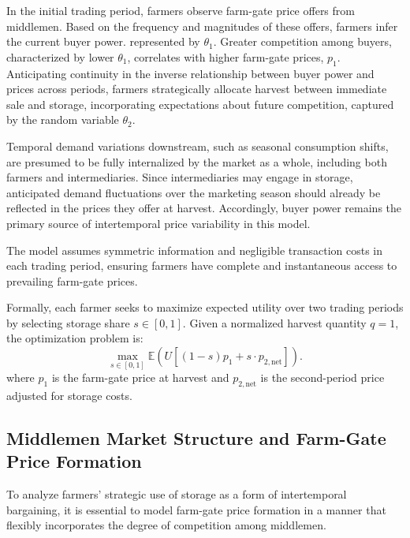 In the initial trading period, farmers observe farm-gate price offers from middlemen. Based on the frequency and magnitudes of these offers, farmers infer the current buyer power. represented by $\theta_1$. Greater competition among buyers, characterized by lower $\theta_1$, correlates with higher farm-gate prices, $p_1$. Anticipating continuity in the inverse relationship between buyer power and prices across periods, farmers strategically allocate harvest between immediate sale and storage, incorporating expectations about future competition, captured by the random variable $\theta_2$.

Temporal demand variations downstream, such as seasonal consumption shifts, are presumed to be fully internalized by the market as a whole, including both farmers and intermediaries. Since intermediaries may engage in storage, anticipated demand fluctuations over the marketing season should already be reflected in the prices they offer at harvest. Accordingly, buyer power remains the primary source of intertemporal price variability in this model.

The model assumes symmetric information and negligible transaction costs in each trading period, ensuring farmers have complete and instantaneous access to prevailing farm-gate prices.

Formally, each farmer seeks to maximize expected utility over two trading periods by selecting storage share $s \in [0,1]$. Given a normalized harvest quantity $q = 1$, the optimization problem is:
\begin{equation}
\label{eq:starting objective}
\max_{s \in [0,1]} \mathbb{E} \left(U\left[ (1 - s) p_1 + s \cdot p_{2,\text{net}} \right]\right).
\end{equation}
where $p_1$ is the farm-gate price at harvest and $p_{2,\text{net}}$ is the second-period price adjusted for storage costs.



\subsection{Middlemen Market Structure and Farm-Gate Price Formation} \label{Section: Middlemen Market Structure and Farm-Gate Price Formation}
\noindent To analyze farmers' strategic use of storage as a form of intertemporal bargaining, it is essential to model farm-gate price formation in a manner that flexibly incorporates the degree of competition among middlemen.

